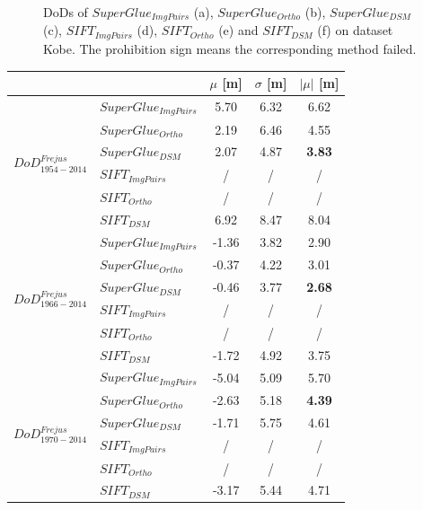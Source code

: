\begin{figure}[htbp]
\begin{center}
        \caption{{\scriptsize DoDs of $SuperGlue_{ImgPairs}$ (a), $SuperGlue_{Ortho}$ (b), $SuperGlue_{DSM}$ (c), $SIFT_{ImgPairs}$ (d), $SIFT_{Ortho}$ (e) and $SIFT_{DSM}$ (f) on dataset Kobe. The prohibition sign means the corresponding method failed.}}
		\label{DoDKobe}
	\end{center}
\end{figure} 


\begin{table}%
	\footnotesize
	\centering
	\begin{tabular}{||l|l|c|c|c||}\hline
		& &$\mu$ [m]&$\sigma$ [m]&$|\mu|$ [m]\\\hline\hline
        \multirow{6}{*}{$DoD^{Frejus}_{1954-2014}$}
&${SuperGlue_{ImgPairs}}$ & 5.70 & 6.32 & 6.62\\
&${SuperGlue_{Ortho}}$ & 2.19 & 6.46 & 4.55\\
&${SuperGlue_{DSM}}$ & 2.07 & 4.87 & \textbf{3.83} \\
&${SIFT_{ImgPairs}}$ & / & / & / \\
&${SIFT_{Ortho}}$ & / & / & / \\
&${SIFT_{DSM}}$ & 6.92 & 8.47 & 8.04\\\hline

\multirow{6}{*}{$DoD^{Frejus}_{1966-2014}$}
&${SuperGlue_{ImgPairs}}$ & -1.36 & 3.82 & 2.90\\
&${SuperGlue_{Ortho}}$ & -0.37 & 4.22 & 3.01\\
&${SuperGlue_{DSM}}$ & -0.46 & 3.77 & \textbf{2.68}\\
&${SIFT_{ImgPairs}}$ & / & / & / \\
&${SIFT_{Ortho}}$ & / & / & / \\
&${SIFT_{DSM}}$ & -1.72 & 4.92 & 3.75\\\hline

\multirow{6}{*}{$DoD^{Frejus}_{1970-2014}$}
&${SuperGlue_{ImgPairs}}$ & -5.04 & 5.09 & 5.70\\
&${SuperGlue_{Ortho}}$ & -2.63 & 5.18 & \textbf{4.39}\\
&${SuperGlue_{DSM}}$ & -1.71 & 5.75 & 4.61\\
&${SIFT_{ImgPairs}}$ & / & / & / \\
&${SIFT_{Ortho}}$ & / & / & / \\
&${SIFT_{DSM}}$ & -3.17 & 5.44 & 4.71\\\hline



\end{tabular}
\end{table}
